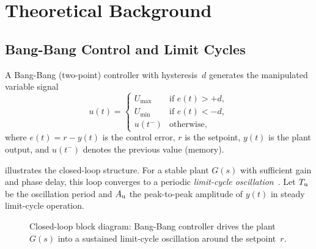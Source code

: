 \section{Theoretical Background}
\label{sec:theory}

\subsection{Bang-Bang Control and Limit Cycles}
\label{sec:theory:bangbang}

A Bang-Bang (two-point) controller with hysteresis~$d$ generates the
manipulated variable signal
\begin{equation}
    u(t) =
    \begin{cases}
        U_{\max} & \text{if } e(t) > +d, \\
        U_{\min} & \text{if } e(t) < -d, \\
        u(t^-)   & \text{otherwise},
    \end{cases}
    \label{eq:bangbang}
\end{equation}
where $e(t) = r - y(t)$ is the control error, $r$ is the setpoint, $y(t)$ is
the plant output, and $u(t^-)$ denotes the previous value (memory).

 illustrates the closed-loop structure.
For a stable plant $G(s)$ with sufficient gain and phase delay, this loop
converges to a periodic \emph{limit-cycle oscillation}~\cite{Atherton1975}.
Let $T_{\mathrm{u}}$ be the oscillation period and $A_{\mathrm{u}}$ the peak-to-peak amplitude of
$y(t)$ in steady limit-cycle operation.

\begin{figure}[htbp]
    \centering
    \caption{Closed-loop block diagram: Bang-Bang controller drives the plant
             $G(s)$ into a sustained limit-cycle oscillation around the
             setpoint~$r$.}
    \label{fig:block_closed_loop}
\end{figure}

